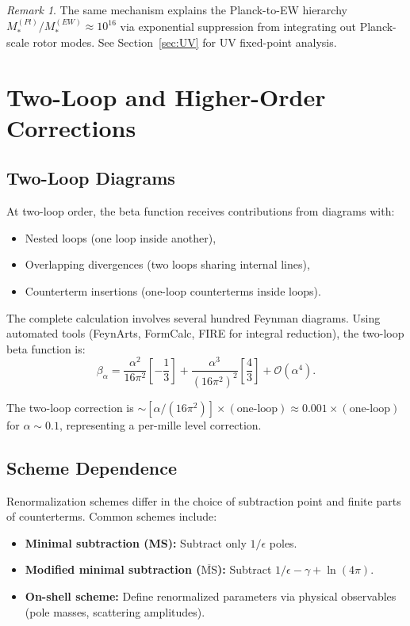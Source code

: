 \documentclass[11pt,a4paper]{article}
\numberwithin{equation}{section}
\theoremstyle{plain}
\theoremstyle{definition}
\theoremstyle{remark}
\newtheorem{remark}[theorem]{Remark}
\begin{document}
\begin{remark}
The same mechanism explains the Planck-to-EW hierarchy $M_*^{(Pl)}/M_*^{(EW)}\approx 10^{16}$ via exponential suppression from integrating out Planck-scale rotor modes. See Section~\ref{sec:UV} for UV fixed-point analysis.
\end{remark}

\vspace{1em}

\section{Two-Loop and Higher-Order Corrections}\label{sec:twoloop}

\subsection{Two-Loop Diagrams}

At two-loop order, the beta function receives contributions from diagrams with:
\begin{itemize}
  \item Nested loops (one loop inside another),
  \item Overlapping divergences (two loops sharing internal lines),
  \item Counterterm insertions (one-loop counterterms inside loops).
\end{itemize}

The complete calculation involves several hundred Feynman diagrams. Using automated tools (FeynArts, FormCalc, FIRE for integral reduction), the two-loop beta function is:
\begin{equation}
\beta_\alpha = \frac{\alpha^2}{16\pi^2}\left[-\frac{1}{3}\right] + \frac{\alpha^3}{(16\pi^2)^2}\left[\frac{4}{3}\right] + \mathcal{O}(\alpha^4).
\label{eq:beta-alpha-2loop-nf3}
\end{equation}

The two-loop correction is $\sim [\alpha/(16\pi^2)]\times(\text{one-loop}) \approx 0.001\times(\text{one-loop})$ for $\alpha\sim 0.1$, representing a per-mille level correction.

\subsection{Scheme Dependence}

Renormalization schemes differ in the choice of subtraction point and finite parts of counterterms. Common schemes include:
\begin{itemize}
  \item \textbf{Minimal subtraction (MS):} Subtract only $1/\epsilon$ poles.
  \item \textbf{Modified minimal subtraction ($\overline{\text{MS}}$):} Subtract $1/\epsilon - \gamma + \ln(4\pi)$.
  \item \textbf{On-shell scheme:} Define renormalized parameters via physical observables (pole masses, scattering amplitudes).
\end{itemize}
\end{document}
